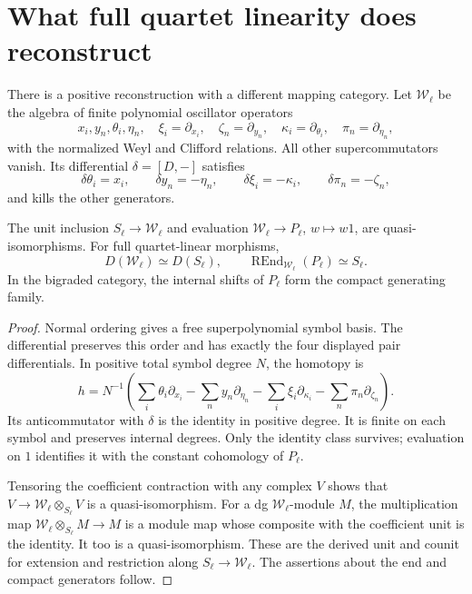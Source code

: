 \section{What full quartet linearity does reconstruct}
\label{sec:vol2-full-quartet-category}

There is a positive reconstruction with a different mapping
category. Let \(\mathscr W_\ell\) be the algebra of finite
polynomial oscillator operators
\[
 x_i,y_n,\theta_i,\eta_n,\quad
 \xi_i=\partial_{x_i},\quad\zeta_n=\partial_{y_n},
 \quad\kappa_i=\partial_{\theta_i},\quad\pi_n=\partial_{\eta_n},
\]
with the normalized Weyl and Clifford relations. All other
supercommutators vanish. Its differential \(\delta=[D,-]\)
satisfies
\[
 \delta\theta_i=x_i,\qquad \delta y_n=-\eta_n,\qquad
 \delta\xi_i=-\kappa_i,\qquad\delta\pi_n=-\zeta_n,
\]
and kills the other generators.

\begin{proposition}\label{prop:vol2-full-quartet-morita}
The unit inclusion \(S_\ell\to\mathscr W_\ell\) and
evaluation \(\mathscr W_\ell\to P_\ell\), \(w\mapsto w1\),
are quasi-isomorphisms. For full quartet-linear morphisms,
\[
 D(\mathscr W_\ell)\simeq D(S_\ell),\qquad
 \operatorname{REnd}_{\mathscr W_\ell}(P_\ell)\simeq S_\ell.
\]
In the bigraded category, the internal shifts of \(P_\ell\)
form the compact generating family.
\end{proposition}
\begin{proof}
Normal ordering gives a free superpolynomial symbol basis.
The differential preserves this order and has exactly the
four displayed pair differentials. In positive total symbol
degree \(N\), the homotopy is
\[
 h=N^{-1}\left(
 \sum_i\theta_i\partial_{x_i}-\sum_n y_n\partial_{\eta_n}
 -\sum_i\xi_i\partial_{\kappa_i}-\sum_n\pi_n\partial_{\zeta_n}
 \right).
\]
Its anticommutator with \(\delta\) is the identity in positive
degree. It is finite on each symbol and preserves internal
degrees. Only the identity class survives; evaluation on \(1\)
identifies it with the constant cohomology of \(P_\ell\).

Tensoring the coefficient contraction with any complex \(V\)
shows that \(V\to\mathscr W_\ell\otimes_{S_\ell}V\) is a
quasi-isomorphism. For a dg \(\mathscr W_\ell\)-module \(M\),
the multiplication map
\(\mathscr W_\ell\otimes_{S_\ell}M\to M\) is a module map
whose composite with the coefficient unit is the identity.
It too is a quasi-isomorphism. These are the derived unit
and counit for extension and restriction along
\(S_\ell\to\mathscr W_\ell\).
The assertions about the end and compact generators follow.
\end{proof}

